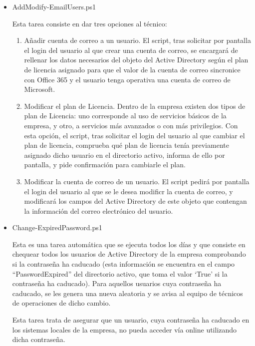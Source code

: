 \documentclass[a4paper, 12pt]{book}
\begin{document}
\begin{itemize}
 
\item AddModify-EmailUsers.ps1 

Esta tarea consiste en dar tres opciones al técnico:

	\begin{enumerate}

	\item Añadir cuenta de correo a un usuario. El script, tras solicitar por pantalla el login del usuario al que crear una cuenta de correo,  se encargará de rellenar los datos necesarios del objeto del Active Directory según el plan de licencia asignado para que el valor de la cuenta de correo sincronice con Office 365 y el usuario tenga operativa una cuenta de correo de Microsoft.

	\item Modificar el plan de Licencia. Dentro de la empresa existen dos tipos de plan de Licencia: uno corresponde al uso de servicios básicos de la empresa, y otro, a servicios más avanzados o con más privilegios. Con esta opción, el script, tras solicitar el login del usuario al que cambiar el plan de licencia, comprueba qué plan de licencia tenía previamente asignado dicho usuario en el directorio activo, informa de ello por pantalla, y pide confirmación para cambiarle el plan.

	\item Modificar la cuenta de correo de un usuario. El script pedirá por pantalla el login del usuario al que se le desea modificr la cuenta de correo, y modificará los campos del Active Directory de este objeto que contengan la información del correo electrónico del usuario.
	\end{enumerate}

\item Change-ExpiredPassword.ps1

Esta es una tarea automática que se ejecuta todos los días y que consiste en chequear todos los usuarios de Active Directory de la empresa comprobando si la contraseña ha caducado (esta información se encuentra en el campo “PasswordExpired” del directorio activo, que toma el valor ‘True’ si la contraseña ha caducado). Para aquellos usuarios cuya contraseña ha caducado, se les genera una nueva aleatoria y se avisa al equipo de técnicos de operaciones de dicho cambio. 

Esta tarea trata de asegurar que un usuario, cuya contraseña ha caducado en los sistemas locales de la empresa, no pueda acceder vía online utilizando dicha contraseña.
\\


\end{itemize}
\end{document}
